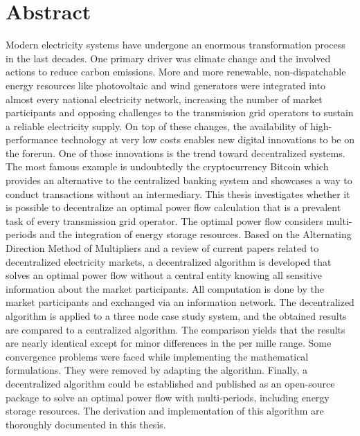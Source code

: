 \section*{Abstract}

Modern electricity systems have undergone an enormous transformation process in the last decades. One primary driver was climate change and the involved actions to reduce carbon emissions. More and more renewable, non-dispatchable energy resources like photovoltaic and wind generators were integrated into almost every national electricity network, increasing the number of market participants and opposing challenges to the transmission grid operators to sustain a reliable electricity supply. On top of these changes, the availability of high-performance technology at very low costs enables new digital innovations to be on the forerun. One of those innovations is the trend toward decentralized systems. The most famous example is undoubtedly the cryptocurrency Bitcoin which provides an alternative to the centralized banking system and showcases a way to conduct transactions without an intermediary. This thesis investigates whether it is possible to decentralize an optimal power flow calculation that is a prevalent task of every transmission grid operator. The optimal power flow considers multi-periods and the integration of energy storage resources. Based on the Alternating Direction Method of Multipliers and a review of current papers related to decentralized electricity markets, a decentralized algorithm is developed that solves an optimal power flow without a central entity knowing all sensitive information about the market participants. All computation is done by the market participants and exchanged via an information network. The decentralized algorithm is applied to a three node case study system, and the obtained results are compared to a centralized algorithm. The comparison yields that the results are nearly identical except for minor differences in the per mille range. Some convergence problems were faced while implementing the mathematical formulations. They were removed by adapting the algorithm. Finally, a decentralized algorithm could be established and published as an open-source package to solve an optimal power flow with multi-periods, including energy storage resources. The derivation and implementation of this algorithm are thoroughly documented in this thesis.